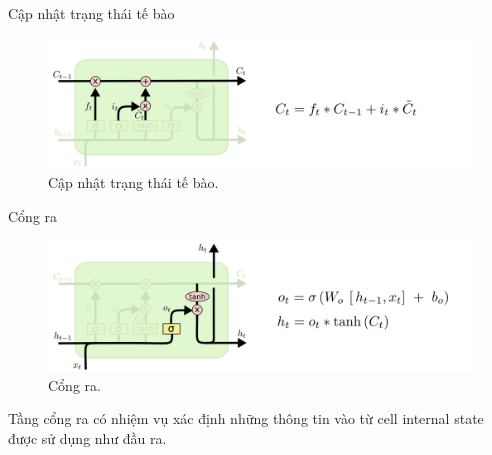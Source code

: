 \documentclass[notheorems,hyperref={bookmarks=true}]{beamer}
\theoremstyle{plain}
\numberwithin{equation}{section}
\begin{document}
\begin{footnotesize}
\begin{frame}{Cập nhật trạng thái tế bào}
\begin{figure}[H]
\centering
	\includegraphics[width=\linewidth]{figures/LSTM3-focus-C.png}
	\caption{Cập nhật trạng thái tế bào.}
\end{figure}
\end{frame}
    \begin{frame}{Cổng ra}
\begin{figure}[H]
\centering
	\includegraphics[width=\linewidth]{figures/LSTM3-focus-o.png}
	\caption{Cổng ra.}
\end{figure}
\par Tầng cổng ra có nhiệm vụ xác định những thông tin vào từ cell internal state được sử dụng như đầu ra.
    \end{frame}

\end{footnotesize}
\end{document}
